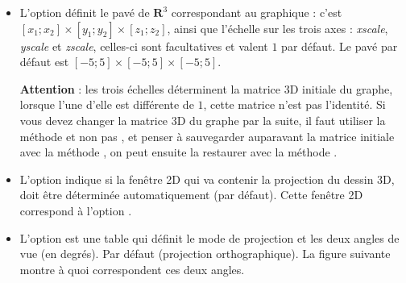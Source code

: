 \begin{itemize}
 \item L'option  définit le pavé de $\mathbf R^3$ correspondant au graphique : c'est $[x_1;x_2]\times[y_1;y_2]\times[z_1;z_2]$, ainsi que l'échelle sur les trois axes : \emph{xscale}, \emph{yscale} et \emph{zscale}, celles-ci  sont facultatives et valent $1$ par défaut. Le pavé par défaut est $[-5;5]\times[-5;5]\times[-5;5]$.
 
 \textbf{Attention} : les trois échelles déterminent la matrice 3D initiale du graphe, lorsque l'une d'elle est différente de $1$, cette matrice n'est pas l'identité. Si vous devez changer la matrice 3D du graphe par la suite, il faut utiliser la méthode  et non pas , et penser à sauvegarder auparavant la matrice initiale avec la méthode , on peut ensuite la restaurer avec la méthode .
 
 \item L'option  indique si la fenêtre 2D qui va contenir la projection du dessin 3D, doit être déterminée automatiquement (\false par défaut). Cette fenêtre 2D correspond à l'option .
 
 \item L'option  est une table qui définit le mode de projection et les deux angles de vue (en degrés). Par défaut  (projection orthographique). La figure suivante montre à quoi correspondent ces deux angles.
 

\end{itemize}
